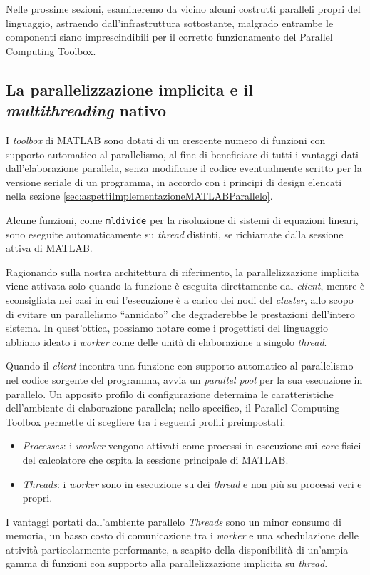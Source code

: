 Nelle prossime sezioni, esamineremo da vicino alcuni costrutti paralleli propri del linguaggio, astraendo dall'infrastruttura sottostante, malgrado entrambe le componenti
siano imprescindibili per il corretto funzionamento del Parallel Computing Toolbox.

\subsection{La parallelizzazione implicita e il \textit{multithreading} nativo}
I \textit{toolbox} di MATLAB sono dotati di un crescente numero di funzioni con supporto automatico al parallelismo, al fine di beneficiare di tutti
i vantaggi dati dall'elaborazione parallela, senza modificare il codice eventualmente scritto per la versione seriale di un programma, in accordo con i principi di design elencati
nella sezione \ref{sec:aspettiImplementazioneMATLABParallelo}.

Alcune funzioni, come \lstinline{mldivide} per la risoluzione di sistemi di equazioni lineari, sono eseguite automaticamente su \textit{thread}
distinti, se richiamate dalla sessione attiva di MATLAB.

Ragionando sulla nostra architettura di riferimento, la parallelizzazione implicita viene attivata solo quando la funzione \`e eseguita direttamente dal \textit{client},
mentre \`e sconsigliata nei casi in cui l'esecuzione \`e a carico dei nodi del \textit{cluster}, allo scopo di evitare un parallelismo \enquote{annidato} che degraderebbe le prestazioni
dell'intero sistema. \newline
In quest'ottica, possiamo notare come i progettisti del linguaggio abbiano ideato i \textit{worker} come delle unit\`a di elaborazione a singolo \textit{thread}.

Quando il \textit{client} incontra una funzione con supporto automatico al parallelismo nel codice sorgente del programma, avvia un \textit{parallel pool} per la sua esecuzione in parallelo. \newline
Un apposito profilo di configurazione determina le caratteristiche dell'ambiente di elaborazione parallela; nello specifico, il Parallel Computing Toolbox permette di scegliere tra i
seguenti profili preimpostati:
\begin{itemize}
    \item \textit{Processes}: i \textit{worker} vengono attivati come processi in esecuzione sui \textit{core} fisici del calcolatore che ospita la sessione
          principale di MATLAB.
    \item \textit{Threads}: i \textit{worker} sono in esecuzione su dei \textit{thread} e non pi\`u su processi veri e propri.
\end{itemize}
I vantaggi portati dall'ambiente
parallelo \textit{Threads} sono un minor consumo di memoria, un basso costo di comunicazione tra i \textit{worker} e una schedulazione delle attivit\`a particolarmente
performante, a scapito della disponibilit\`a di un'ampia gamma di funzioni con supporto alla parallelizzazione implicita su \textit{thread}.


